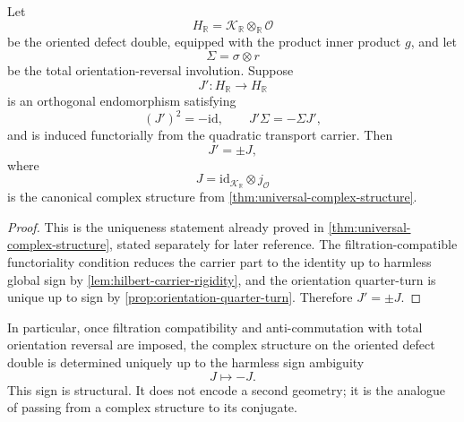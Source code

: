 \begin{proposition}
	\label{prop:hilbert-J-unique}
	Let
	\[
		H_{\mathbb R}=\mathcal K_{\mathbb R}\otimes_{\mathbb R}\mathcal O
	\]
	be the oriented defect double, equipped with the product inner product
	\(g\), and let
	\[
		\Sigma=\sigma\otimes r
	\]
	be the total orientation-reversal involution.
	Suppose
	\[
		J':H_{\mathbb R}\to H_{\mathbb R}
	\]
	is an orthogonal endomorphism satisfying
	\[
		(J')^{2}=-\mathrm{id},
		\qquad
		J'\Sigma=-\Sigma J',
	\]
	and is induced functorially from the quadratic transport carrier.
	Then
	\[
		J'=\pm J,
	\]
	where
	\[
		J=\mathrm{id}_{\mathcal K_{\mathbb R}}\otimes j_{\mathcal O}
	\]
	is the canonical complex structure from
	\cref{thm:universal-complex-structure}.
\end{proposition}
\begin{proof}
	This is the uniqueness statement already proved in
	\cref{thm:universal-complex-structure}, stated separately for later
	reference.
	The filtration-compatible functoriality condition reduces the carrier
	part to the identity up to harmless global sign by
	\cref{lem:hilbert-carrier-rigidity}, and the orientation quarter-turn is
	unique up to sign by \cref{prop:orientation-quarter-turn}.
	Therefore \(J'=\pm J\).
\end{proof}
In particular, once filtration compatibility and anti-commutation with
total orientation reversal are imposed, the complex structure on the
oriented defect double is determined uniquely up to the harmless sign
ambiguity
\[
	J\mapsto -J.
\]
This sign is structural.
It does not encode a second geometry; it is the analogue of passing from
a complex structure to its conjugate.
